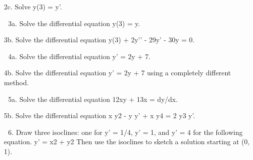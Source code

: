 \documentclass{ximera}
\begin{document}
2c. Solve y(3) = y’.





3a. Solve the differential equation y(3) = y. 




















3b. Solve the differential equation y(3) + 2y’’ - 29y’ - 30y = 0.




4a. Solve the differential equation y’ = 2y + 7.





















4b. Solve the differential equation y’ = 2y + 7 using a completely different method.
















5a. Solve the differential equation 12xy + 13x = dy/dx.




















5b. Solve the differential equation x y2 - y y’ + x y4 = 2 y3 y’.


6. Draw three isoclines: one for y’ = 1/4, y’ = 1, and y’ = 4 for the following equation.
	y’ = x2 + y2	 Then use the isoclines to sketch a solution starting at (0, 1).
\end{document}
